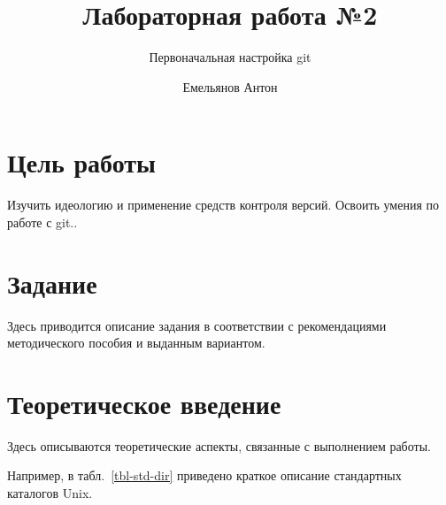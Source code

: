 \documentclass[
  english,
  russian,
  12pt,
  a4paper,
  DIV=11,
  numbers=noendperiod]{scrreprt}
\title{Лабораторная работа №2}
\subtitle{Первоначальная настройка git}
\author{Емельянов Антон}
\date{}
\renewcommand*\contentsname{Содержание}
\newcommand\contentsname{Содержание}
\begin{document}
\maketitle

\renewcommand*\contentsname{Содержание}
{
\setcounter{tocdepth}{1}
\tableofcontents
}
\listoffigures
\listoftables

\chapter{Цель
работы}\label{ux446ux435ux43bux44c-ux440ux430ux431ux43eux442ux44b}

Изучить идеологию и применение средств контроля версий. Освоить умения
по работе с git..

\chapter{Задание}\label{ux437ux430ux434ux430ux43dux438ux435}

Здесь приводится описание задания в соответствии с рекомендациями
методического пособия и выданным вариантом.

\chapter{Теоретическое
введение}\label{ux442ux435ux43eux440ux435ux442ux438ux447ux435ux441ux43aux43eux435-ux432ux432ux435ux434ux435ux43dux438ux435}

Здесь описываются теоретические аспекты, связанные с выполнением работы.

Например, в табл.~\ref{tbl-std-dir} приведено краткое описание
стандартных каталогов Unix.
\end{document}
